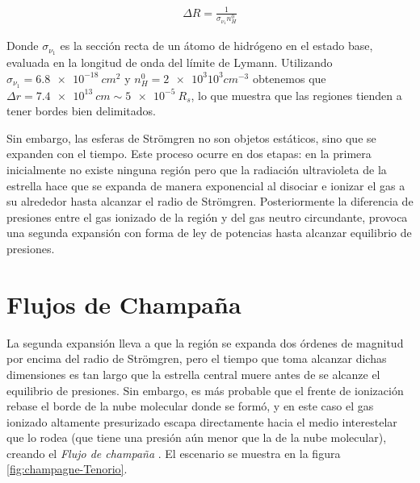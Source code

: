 \begin{align}
\Delta R = \frac{1}{\sigma_{\nu_1}n^0_H}  
\end{align}

Donde $\sigma_{\nu_1}$ es la sección recta de un átomo de hidrógeno en el estado base, evaluada en la longitud de onda del límite de Lymann. Utilizando $\sigma_{\nu_1} = \SI{6.8e-18}{cm^2}$ y $n^0_H = \SI{2e3} 10^{3}{cm^{-3}}$ obtenemos que $\Delta r = \SI{7.4e13}{cm} \sim \SI{5e-5}{R_s}$, lo que muestra que las regiones  tienden a tener bordes bien delimitados.

Sin embargo, las esferas de Strömgren no son objetos estáticos, sino que se expanden con el tiempo. Este proceso ocurre en dos etapas: en la primera inicialmente no existe ninguna región  pero que la radiación ultravioleta de la estrella hace que se expanda de manera exponencial al disociar e ionizar el gas a su alrededor hasta alcanzar el radio de Strömgren. Posteriormente la diferencia de presiones entre el gas ionizado de la región  y del gas neutro circundante, provoca una segunda expansión con forma de ley de potencias hasta alcanzar equilibrio de presiones.

\section{Flujos de Champaña}%
La segunda expansión lleva a que la región  se expanda dos órdenes de magnitud por encima del radio de Strömgren, pero el tiempo que toma alcanzar dichas dimensiones es tan largo que la estrella central muere antes de se alcanze el equilibrio de presiones. Sin embargo, es más probable que el frente de ionización rebase el borde de la nube molecular donde se formó, y en este caso el gas ionizado altamente presurizado escapa directamente hacia el medio interestelar que lo rodea (que tiene una presión aún menor que la de la nube molecular), creando el \textit{Flujo de champaña} \citep{Stahler:2004}. El escenario se muestra en la figura \ref{fig:champagne-Tenorio}.

